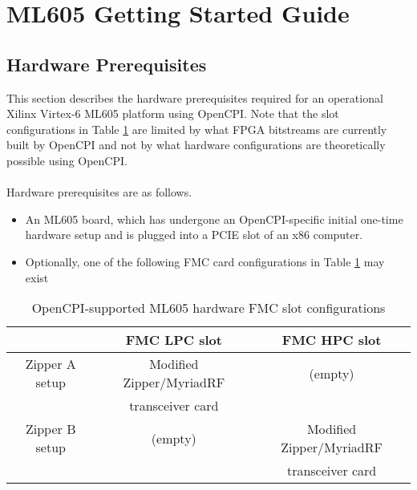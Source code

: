 \documentclass{article}
\begin{document}
\section*{ML605 Getting Started Guide}
\subsection*{Hardware Prerequisites}
This section describes the hardware prerequisites required for an operational Xilinx Virtex-6 ML605 platform using OpenCPI. Note that the slot configurations in Table \ref{table:supported_slots} are limited by what FPGA bitstreams are currently built by OpenCPI and not by what hardware configurations are theoretically possible using OpenCPI.\\ \\
Hardware prerequisites are as follows.
\begin{itemize}
\item An ML605 board, which has undergone an OpenCPI-specific initial one-time hardware setup \cite{ml605_hardware_setup} and is plugged into a PCIE slot of an x86 computer.
\item Optionally, one of the following FMC card configurations in Table  \ref{table:supported_slots} may exist
\end{itemize}
\begin{center}
        \begin{table}[!htbp]
        \centering
        \caption{OpenCPI-supported ML605 hardware FMC slot configurations}
        \label{table:supported_slots}
        \begin{tabular}{c|c|c|}
                \cline{2-3}
                & FMC LPC slot & FMC HPC slot \\ \hline
                \multicolumn{1}{|c|}{Zipper A setup} & Modified\cite{zipper_mods} Zipper/MyriadRF & (empty)\\
                \multicolumn{1}{|c|}{ } & transceiver card & \\ \hline
                \multicolumn{1}{|c|}{Zipper B setup} & (empty) & Modified\cite{zipper_mods} Zipper/MyriadRF \\
                \multicolumn{1}{|c|}{ } & & transceiver card \\ \hline
        \end{tabular}
        \end{table}
\end{center}
\end{document}
